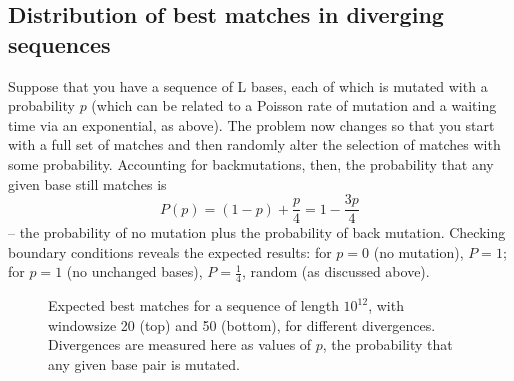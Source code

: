 \subsection{Distribution of best matches in diverging sequences}

Suppose that you have a sequence of L bases, each of which is
mutated with a probability $p$ (which can be related to a Poisson
rate of mutation and a waiting time via an exponential, as above).
The problem now changes so that you start with a full set of matches
and then randomly alter the selection of matches with some probability.
Accounting for backmutations, then, the probability that any given
base still matches is
\[
P(p) = (1 - p) + \frac{p}{4} = 1 - \frac{3p}{4}
\]
-- the probability of no mutation plus the probability of back mutation.
Checking boundary conditions reveals the expected results: for $p=0$
(no mutation), $P = 1$; for $p=1$ (no unchanged bases), $P=\frac{1}{4}$,
random (as discussed above).

\begin{figure}
\caption{Expected best matches for a sequence of length $10^{12}$,
with windowsize 20 (top) and 50 (bottom),
for different divergences.  Divergences are
measured here as values of $p$, the probability that any given
base pair is mutated.}
\end{figure}

